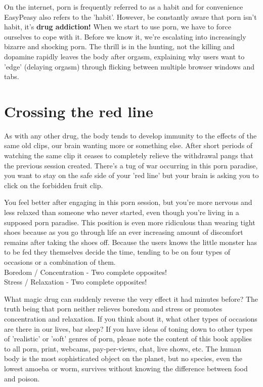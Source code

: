\documentclass[easypeasy.tex]{subfiles}
\begin{document}
On the internet, porn is frequently referred to as a habit and for convenience EasyPeasy also refers to the 'habit'. However, be constantly aware that porn isn't habit, it's \textbf{drug addiction!} When we start to use porn, we have to force ourselves to cope with it. Before we know it, we're escalating into increasingly bizarre and shocking porn. The thrill is in the hunting, not the killing and dopamine rapidly leaves the body after orgasm, explaining why users want to 'edge' (delaying orgasm) through flicking between multiple browser windows and tabs.

\section{Crossing the red line}
As with any other drug, the body tends to develop immunity to the effects of the same old clips, our brain wanting more or something else. After short periods of watching the same clip it ceases to completely relieve the withdrawal pangs that the previous session created. There's a tug of war occurring in this porn paradise, you want to stay on the safe side of your 'red line' but your brain is asking you to click on the forbidden fruit clip.

You feel better after engaging in this porn session, but you're more nervous and less relaxed than someone who never started, even though you're living in a supposed porn paradise. This position is even more ridiculous than wearing tight shoes because as you go through life an ever increasing amount of discomfort remains after taking the shoes off. Because the users knows the little monster has to be fed they themselves decide the time, tending to be on four types of occasions or a combination of them. \\
  Boredom / Concentration - Two complete opposites! \\
  Stress / Relaxation - Two complete opposites!

What magic drug can suddenly reverse the very effect it had minutes before? The truth being that porn neither relieves boredom and stress or promotes concentration and relaxation. If you think about it, what other types of occasions are there in our lives, bar sleep? If you have ideas of toning down to other types of 'realistic' or 'soft' genres of porn, please note the content of this book applies to all porn, print, webcams, pay-per-views, chat, live shows, etc. The human body is the most sophisticated object on the planet, but no species, even the lowest amoeba or worm, survives without knowing the difference between food and poison.
\end{document}

